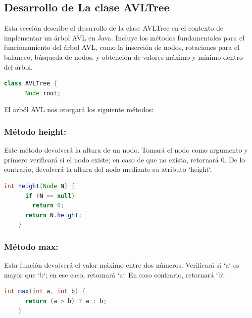 \documentclass{article}
\begin{document}

  \subsection{Desarrollo de La clase AVLTree}
  Esta sección describe el desarrollo de la clase AVLTree en el contexto de implementar un árbol AVL en Java. 
  Incluye los métodos fundamentales para el funcionamiento del árbol AVL, como la inserción de nodos, rotaciones 
  para el balanceo, búsqueda de nodos, y obtención de valores máximo y mínimo dentro del árbol. 
  \begin{lstlisting}[language=Java, caption={Ejemplo de código Java}]
    class AVLTree {
      Node root;
  \end{lstlisting}
  
  El arból AVL nos otorgará los siguiente métodos:
  

  \subsubsection{Método height: }Este método devolverá la altura de un nodo. Tomará el nodo como argumento y 
  primero verificará si el nodo existe; en caso de que no exista, retornará 0. 
  De lo contrario, devolverá la altura del nodo mediante su atributo `height`.
  \begin{lstlisting}[language=Java, caption={Ejemplo de código Java}]
    int height(Node N) {
      if (N == null)
        return 0;
      return N.height;
    }
  \end{lstlisting}
  

  \subsubsection{Método max: }Esta función devolverá el valor máximo entre dos números. Verificará si 
  `a` es mayor que `b`; en ese caso, retornará `a`. En caso contrario, retornará `b`.
  \begin{lstlisting}[language=Java, caption={Ejemplo de código Java}]
    int max(int a, int b) {
      return (a > b) ? a : b;
    }
  \end{lstlisting}
  
\end{document}

